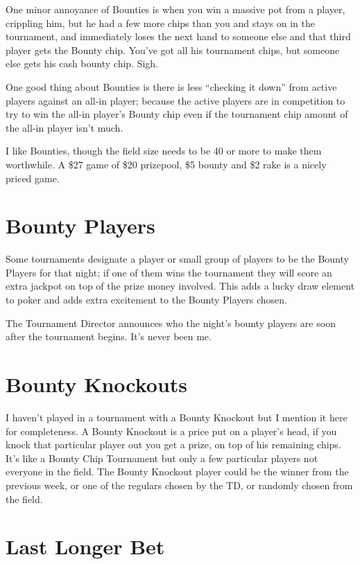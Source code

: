 One minor annoyance of Bounties is when you win a massive pot
from a player, crippling him, but he had a few more chips than
you and stays on in the tournament, and immediately loses the
next hand to someone else and that third player gets the
Bounty chip. You've got all his tournament chips, but someone
else gets his cash bounty chip. Sigh.

One good thing about Bounties is there is less ``checking it down''
from active players against an all-in player; because the active
players are in competition to try to win the all-in player's
Bounty chip even if the tournament chip amount of the all-in player
isn't much.

I like Bounties, though the field size needs to be 40 or more to
make them worthwhile. A \$27 game of \$20 prizepool, \$5 bounty
and \$2 rake is a nicely priced game.

\section{Bounty Players}

Some tournaments designate a player or small group of players
to be the Bounty Players for that night; if one of them wins
the tournament they will score an extra jackpot on top of
the prize money involved. This adds a lucky draw element to
poker and adds extra excitement to the Bounty Players chosen.

The Tournament Director announces who the night's bounty players
are soon after the tournament begins. It's never been me.

\section{Bounty Knockouts}

I haven't played in a tournament with a Bounty Knockout but I
mention it here for completeness. A Bounty Knockout is a price
put on a player's head, if you knock that particular player out
you get a prize, on top of his remaining chips. It's like a
Bounty Chip Tournament but only a few particular players not
everyone in the field. The Bounty Knockout player could be the
winner from the previous week, or one of the regulars chosen
by the TD, or randomly chosen from the field.

\section{Last Longer Bet}

